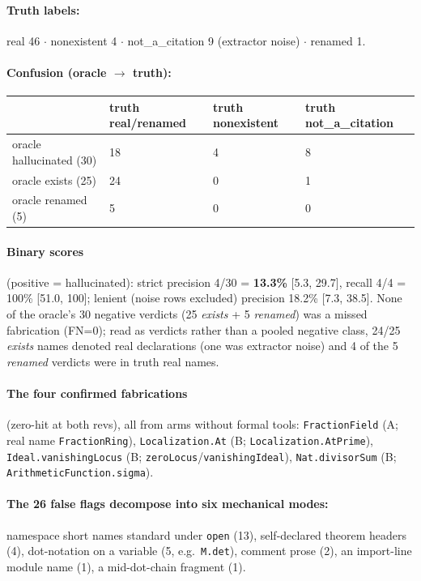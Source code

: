 \documentclass[10pt]{article}
\newcommand{\code}[1]{\texttt{#1}}
\begin{document}
\paragraph{Truth labels:} real 46 $\cdot$ nonexistent 4 $\cdot$
not\_a\_citation 9 (extractor noise) $\cdot$ renamed 1.

\paragraph{Confusion (oracle $\to$ truth):}

\begin{center}\footnotesize
\begin{tabular}{@{}llll@{}}
\toprule
 & truth real/renamed & truth nonexistent & truth not\_a\_citation \\
\midrule
oracle hallucinated (30) & 18 & 4 & 8 \\
oracle exists (25) & 24 & 0 & 1 \\
oracle renamed (5) & 5 & 0 & 0 \\
\bottomrule
\end{tabular}
\end{center}

\paragraph{Binary scores} (positive = hallucinated): strict precision
4/30 = \textbf{13.3\%} [5.3, 29.7], recall 4/4 = 100\% [51.0, 100];
lenient (noise rows excluded) precision 18.2\% [7.3, 38.5]. None of the
oracle's 30 negative verdicts (25 \emph{exists} + 5 \emph{renamed}) was
a missed fabrication (FN=0); read as verdicts rather than a pooled
negative class, 24/25 \emph{exists} names denoted real declarations
(one was extractor noise) and 4 of the 5 \emph{renamed} verdicts were
in truth real names.

\paragraph{The four confirmed fabrications} (zero-hit at both revs),
all from arms without formal tools: \code{FractionField} (A; real name
\code{FractionRing}), \code{Localization.At} (B;
\code{Localization.AtPrime}), \code{Ideal.vanishingLocus} (B;
\code{zeroLocus}/\code{vanishingIdeal}), \code{Nat.divisorSum} (B;
\code{ArithmeticFunction.sigma}).

\paragraph{The 26 false flags decompose into six mechanical modes:}
namespace short names standard under \code{open} (13), self-declared
theorem headers (4), dot-notation on a variable (5, e.g.\
\code{M.det}), comment prose (2), an import-line module name (1), a
mid-dot-chain fragment (1).
\end{document}
